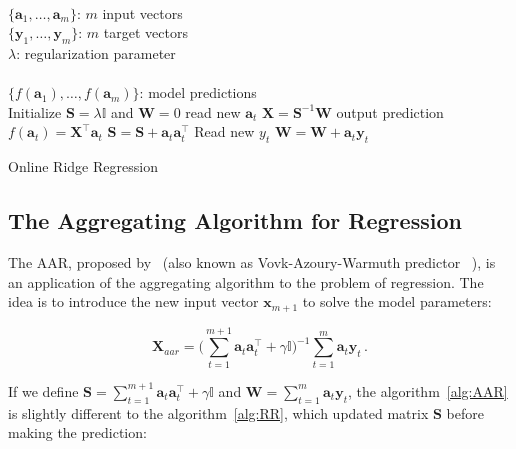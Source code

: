 \documentclass[twocolumn]{svjour3}          %
\begin{document}
\begin{algorithm}[H]
\begin{algorithmic}[1]
\REQUIRE $\,$ \\
$\{\mathbf{a}_1,\dots,\mathbf{a}_{m} \}$: $m$ input vectors \\
$\{\mathbf{y}_1,\dots,\mathbf{y}_{m} \}$: $m$ target vectors \\
$\lambda$: regularization parameter \\
\ENSURE  $\,$ \\
$\{f(\mathbf{a}_1),\dots,f(\mathbf{a}_{m}) \}$: model predictions \\
\STATE Initialize $\mathbf{S}=\lambda \mathbb{I}$
and $\mathbf{W}=0$
	\STATE read new $\mathbf{a}_t$
	\STATE $\mathbf{X}=\mathbf{S}^{-1}\mathbf{W}$
	\STATE output prediction $f(\mathbf{a}_t) = \mathbf{X}^\top \mathbf{a}_t$
   	\STATE $\mathbf{S} = \mathbf{S} + \mathbf{a}_t \mathbf{a}_t^\top$
   	\STATE Read new $y_t$
    	\STATE $\mathbf{W} = \mathbf{W} + \mathbf{a}_t \mathbf{y}_t$
\ENDFOR
\end{algorithmic}
\caption{Online Ridge Regression}
\label{alg:RR}
\end{algorithm}


\subsection{The Aggregating Algorithm for Regression}

The AAR, proposed by~\cite{vovk2001} (also known as Vovk-Azoury-Warmuth predictor ~\cite{azoury2001}), is an application of the aggregating
algorithm to the problem of regression. The idea is to introduce the new input
vector $\mathbf{x}_{m+1}$ to solve the model parameters: 

\begin{equation}
\label{eq:AARexpand}
\mathbf{X}_{aar} = \displaystyle \big (\sum_{t=1}^{m+1}
\mathbf{a}_t \mathbf{a}_t  ^\top+ \gamma \mathbb{I}\big )^{-1}
\sum_{t=1}^m \mathbf{a}_t \mathbf{y}_t \, .
\end{equation}

If we define $\displaystyle\mathbf{S}= \sum_{t=1}^{m+1} \mathbf{a}_t
\mathbf{a}_t  ^\top + \gamma \mathbb{I} $ and $\mathbf{W}=
\displaystyle\sum_{t=1}^m \mathbf{a}_t \mathbf{y}_t$, the
algorithm~\ref{alg:AAR} is slightly different to the algorithm~\ref{alg:RR}, 
which updated matrix $\mathbf{S}$ before making the prediction:
\end{document}
